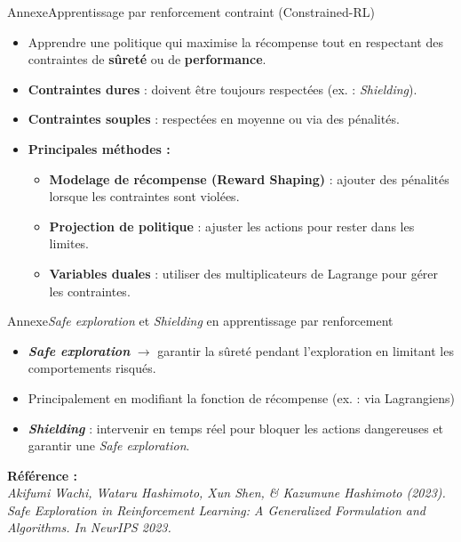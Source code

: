 \begin{frame}{Annexe}{Apprentissage par renforcement contraint (Constrained-RL)}

    \begin{itemize}
        \item Apprendre une politique qui maximise la récompense tout en respectant des contraintes de \textbf{sûreté} ou de \textbf{performance}.

        \item \textbf{Contraintes dures} : doivent être toujours respectées (ex. : \textit{Shielding}).
        \item \textbf{Contraintes souples} : respectées en moyenne ou via des pénalités.

        \item \textbf{Principales méthodes :}
              \begin{itemize}
                  \item \textbf{Modelage de récompense (Reward Shaping)} : ajouter des pénalités lorsque les contraintes sont violées.
                  \item \textbf{Projection de politique} : ajuster les actions pour rester dans les limites.
                  \item \textbf{Variables duales} : utiliser des multiplicateurs de Lagrange pour gérer les contraintes.
              \end{itemize}
    \end{itemize}

\end{frame}

\begin{frame}{Annexe}{\textit{Safe exploration} et \textit{Shielding} en apprentissage par renforcement}

    \begin{itemize}
        \item \textbf{\textit{Safe exploration}} $\rightarrow$ garantir la sûreté pendant l'exploration en limitant les comportements risqués.
        \item Principalement en modifiant la fonction de récompense (ex. : via Lagrangiens)
        \item \textbf{\textit{Shielding}} : intervenir en temps réel pour bloquer les actions dangereuses et garantir une \textit{Safe exploration}.
    \end{itemize}

    \textbf{Référence :} \\
    \textit{Akifumi Wachi, Wataru Hashimoto, Xun Shen, \& Kazumune Hashimoto (2023). Safe Exploration in Reinforcement Learning: A Generalized Formulation and Algorithms. In NeurIPS 2023.}

\end{frame}

